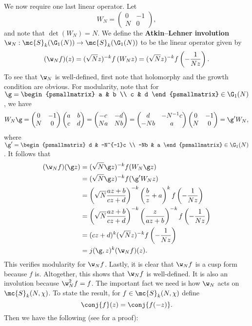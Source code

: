     We now require one last linear operator. Let
    \[
      W_{N} = \begin{pmatrix} 0 & -1 \\ N & 0 \end{pmatrix},
    \]
    and note that $\det(W_{N}) = N$. We define the \textbf{Atkin–Lehner involution} $\w_{N}:\mc{S}_{k}(\G_{1}(N)) \to \mc{S}_{k}(\G_{1}(N))$ to be the linear operator given by
    \[
      (\w_{N}f)(z) = (\sqrt{N}z)^{-k}f\left(W_{N}z\right) = (\sqrt{N}z)^{-k}f\left(-\frac{1}{Nz}\right).
    \]
    To see that $\w_{N}$ is well-defined, first note that holomorphy and the growth condition are obvious. For modularity, note that for $\g = \begin{psmallmatrix} a & b \\ c & d \end{psmallmatrix} \in \G_{1}(N)$, we have
    \[
      W_{N}\g = \begin{pmatrix} 0 & -1 \\ N & 0 \end{pmatrix}\begin{pmatrix} a & b \\ c & d \end{pmatrix} = \begin{pmatrix} -c & -d \\ Na & Nb \\ \end{pmatrix} = \begin{pmatrix} d & -N^{-1}c \\ -Nb & a \end{pmatrix}\begin{pmatrix} 0 & -1 \\ N & 0 \end{pmatrix} = \g'W_{N},
    \]
    where $\g' = \begin{psmallmatrix} d & -N^{-1}c \\ -Nb & a \end{psmallmatrix} \in \G_{1}(N)$. It follows that
    \begin{align*}
      (\w_{N}f)(\g z) &= (\sqrt{N}\g z)^{-k}f(W_{N}\g z) \\
      &= (\sqrt{N}\g z)^{-k}f(\g'W_{N}z) \\
      &= \left(\sqrt{N}\frac{az+b}{cz+d}\right)^{-k}\left(\frac{b}{z}+a\right)^{k}f\left(-\frac{1}{Nz}\right) \\
      &= \left(\sqrt{N}\frac{az+b}{cz+d}\right)^{-k}\left(\frac{z}{az+b}\right)^{-k}f\left(-\frac{1}{Nz}\right) \\
      &= (cz+d)^{k}(\sqrt{N}z)^{-k}f\left(-\frac{1}{Nz}\right) \\
      &= j(\g,z)^{k}(\w_{N}f)(z).
    \end{align*}
    This verifies modularity for $\w_{N}f$. Lastly, it is clear that $\w_{N}f$ is a cusp form because $f$ is. Altogether, this shows that $\w_{N}f$ is well-defined. It is also an involution because $\w_{N}^{2}f = f$. The important fact we need is how $\w_{N}$ acts on $\mc{S}_{k}(N,\chi)$. To state the result, for $f \in \mc{S}_{k}(N,\chi)$ define
    \[
      \conj{f}(z) = \conj{f(-z)}.
    \]
    Then we have the following (see \cite{cohenmodular2017} for a proof):

